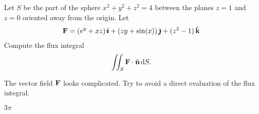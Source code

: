 \begin{question}[M317 2006D] %
Let $S$ be the part of the sphere $x^2 + y^2 + z^2 = 4$ between the 
planes $z = 1$ and $z = 0$ oriented away from the origin. Let
\begin{align*}
\mathbf{F} = (e^y + xz)\,\hat{\pmb{\imath}} + (zy + \sin(x))\,\hat{\pmb{\jmath}} + (z^2 - 1)\,\hat{\mathbf{k}}
\end{align*}
Compute the flux integral
\begin{align*}
\iint_S \mathbf{F}\cdot\hat{\mathbf{n}}\,\mathrm{d}S.
\end{align*}
\end{question}

\begin{hint} 
The vector field $\mathbf{F}$ looks complicated. Try to avoid a direct
evaluation of the flux integral.
\end{hint}

\begin{answer} 
$3\pi$
\end{answer}

